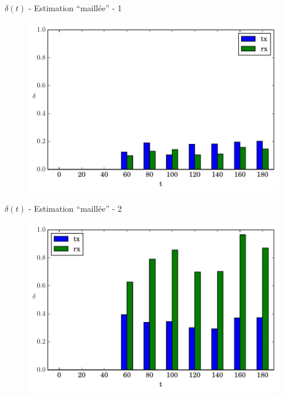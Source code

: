 \begin{frame}{$\delta(t)$ - Estimation ``maillée'' - 1}
  \begin{figure}
    \centering  
    \includegraphics[width=\textwidth]{figures/evolution_route_1.pdf}
  \end{figure}
\end{frame}

\begin{frame}{$\delta(t)$ - Estimation ``maillée'' - 2}
  \begin{figure}
    \centering  
    \includegraphics[width=\textwidth]{figures/evolution_route_2.pdf}
  \end{figure}
\end{frame}

